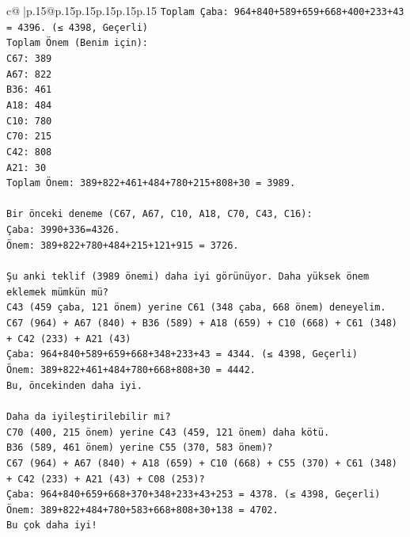 \documentclass{article}
\begin{document}
{\begin{supertabular}{c@{$\;$}|p{.15\linewidth}@{}p{.15\linewidth}p{.15\linewidth}p{.15\linewidth}p{.15\linewidth}p{.15\linewidth}}
{{{\texttt{Toplam Çaba: 964+840+589+659+668+400+233+43 = 4396. (≤ 4398, Geçerli)} \\
\texttt{Toplam Önem (Benim için):} \\
\texttt{C67: 389} \\
\texttt{A67: 822} \\
\texttt{B36: 461} \\
\texttt{A18: 484} \\
\texttt{C10: 780} \\
\texttt{C70: 215} \\
\texttt{C42: 808} \\
\texttt{A21: 30} \\
\texttt{Toplam Önem: 389+822+461+484+780+215+808+30 = 3989.} \\
\\ 
\texttt{Bir önceki deneme (C67, A67, C10, A18, C70, C43, C16):} \\
\texttt{Çaba: 3990+336=4326.} \\
\texttt{Önem: 389+822+780+484+215+121+915 = 3726.} \\
\\ 
\texttt{Şu anki teklif (3989 önemi) daha iyi görünüyor. Daha yüksek önem eklemek mümkün mü?} \\
\texttt{C43 (459 çaba, 121 önem) yerine C61 (348 çaba, 668 önem) deneyelim.} \\
\texttt{C67 (964) + A67 (840) + B36 (589) + A18 (659) + C10 (668) + C61 (348) + C42 (233) + A21 (43)} \\
\texttt{Çaba: 964+840+589+659+668+348+233+43 = 4344. (≤ 4398, Geçerli)} \\
\texttt{Önem: 389+822+461+484+780+668+808+30 = 4442.} \\
\texttt{Bu, öncekinden daha iyi.} \\
\\ 
\texttt{Daha da iyileştirilebilir mi?} \\
\texttt{C70 (400, 215 önem) yerine C43 (459, 121 önem) daha kötü.} \\
\texttt{B36 (589, 461 önem) yerine C55 (370, 583 önem)?} \\
\texttt{C67 (964) + A67 (840) + A18 (659) + C10 (668) + C55 (370) + C61 (348) + C42 (233) + A21 (43) + C08 (253)?} \\
\texttt{Çaba: 964+840+659+668+370+348+233+43+253 = 4378. (≤ 4398, Geçerli)} \\
\texttt{Önem: 389+822+484+780+583+668+808+30+138 = 4702.} \\
\texttt{Bu çok daha iyi!} \\
}}}
\end{supertabular}}
\end{document}
